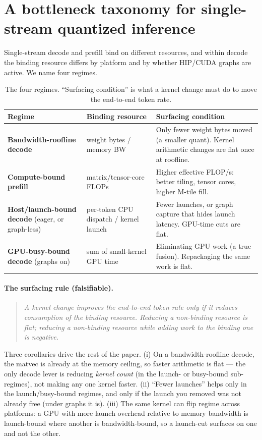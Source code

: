 \documentclass[11pt]{article}
\begin{document}
\section{A bottleneck taxonomy for single-stream quantized inference}
\label{sec:taxonomy}
Single-stream decode and prefill bind on different resources, and within decode the binding
resource differs by platform and by whether HIP/CUDA graphs are active. We name four regimes.

\begin{table}[h]
\centering
\caption{The four regimes. ``Surfacing condition'' is what a kernel change must do to move the
end-to-end token rate.}
\small
\begin{tabular}{>{\raggedright\arraybackslash}p{2.8cm} >{\raggedright\arraybackslash}p{4.3cm} >{\raggedright\arraybackslash}p{6.0cm}}
\toprule
Regime & Binding resource & Surfacing condition \\
\midrule
\textbf{Bandwidth-roofline decode} & weight bytes / memory BW & Only fewer weight bytes moved (a smaller quant). Kernel arithmetic changes are flat once at roofline. \\
\textbf{Compute-bound prefill} & matrix/tensor-core FLOPs & Higher effective FLOP/s: better tiling, tensor cores, higher M-tile fill. \\
\textbf{Host/launch-bound decode} (eager, or graph-less) & per-token CPU dispatch / kernel launch & Fewer launches, or graph capture that hides launch latency. GPU-time cuts are flat. \\
\textbf{GPU-busy-bound decode} (graphs on) & sum of small-kernel GPU time & Eliminating GPU work (a true fusion). Repackaging the same work is flat. \\
\bottomrule
\end{tabular}
\end{table}

\paragraph{The surfacing rule (falsifiable).}
\begin{quote}\itshape
A kernel change improves the end-to-end token rate only if it reduces consumption of the
\emph{binding} resource. Reducing a non-binding resource is flat; reducing a non-binding resource
\emph{while adding} work to the binding one is negative.
\end{quote}
Three corollaries drive the rest of the paper. (i) On a bandwidth-roofline decode, the matvec is
already at the memory ceiling, so faster arithmetic is flat --- the only decode lever is reducing
\emph{kernel count} (in the launch- or busy-bound sub-regimes), not making any one kernel faster.
(ii) ``Fewer launches'' helps only in the launch/busy-bound regimes, and only if the launch you
removed was not already free (under graphs it is). (iii) The same kernel can flip regime across
platforms: a GPU with more launch overhead relative to memory bandwidth is launch-bound where
another is bandwidth-bound, so a launch-cut surfaces on one and not the other.
\end{document}
